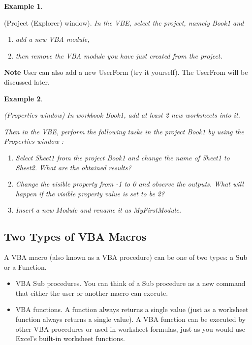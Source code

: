 \documentclass[
]{article}
\theoremstyle{definition}
\theoremstyle{definition}
\newtheorem{example}{Example}[section]
\theoremstyle{definition}
\theoremstyle{definition}
\theoremstyle{remark}
\begin{document}
\begin{example}
\protect\hypertarget{exm:unlabeled-div-19}{}\label{exm:unlabeled-div-19}

(Project (Explorer) window). \emph{In the VBE, select the
project, namely Book1 and}

\begin{enumerate}
\def\labelenumi{\arabic{enumi}.}
\item
  \emph{add a new VBA module,}
\item
  \emph{then remove the VBA module you have just created from the project.}
\end{enumerate}

\end{example}

\textbf{Note} User can also add a new UserForm (try it yourself). The
UserFrom will be discussed later.

\begin{example}
\protect\hypertarget{exm:unlabeled-div-20}{}\label{exm:unlabeled-div-20}

\emph{(Properties window) In workbook Book1, add at least 2
new worksheets into it.}

\emph{Then in the VBE, perform the following tasks in the project Book1 by
using the Properties window :}

\begin{enumerate}
\def\labelenumi{\arabic{enumi}.}
\item
  \emph{Select Sheet1 from the project Book1 and change the name of Sheet1
  to Sheet2. What are the obtained results?}
\item
  \emph{Change the visible property from -1 to 0 and observe the outputs.
  What will happen if the visible property value is set to be 2?}
\item
  \emph{Insert a new Module and rename it as MyFirstModule.}
\end{enumerate}

\end{example}

\hypertarget{two-types-of-vba-macros}{%
\subsection{Two Types of VBA Macros}\label{two-types-of-vba-macros}}

A VBA macro (also known as a VBA procedure) can be one of two types: a
Sub or a Function.

\begin{itemize}
\item
  VBA Sub procedures. You can think of a Sub procedure as a new
  command that either the user or another macro can execute.
\item
  VBA functions. A function always returns a single value (just as a
  worksheet function always returns a single value). A VBA function
  can be executed by other VBA procedures or used in worksheet
  formulas, just as you would use Excel's built-in worksheet
  functions.
\end{itemize}
\end{document}
